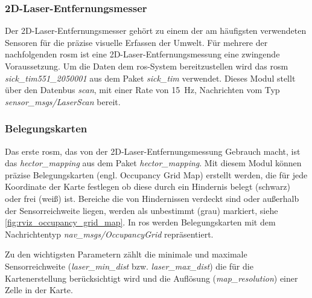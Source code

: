 \begin{comment}
--------------------------------------------------------------------------------
- \url{http://wiki.ros.org/sick_tim}
\end{comment}
\subsubsection{2D-Laser-Entfernungsmesser}

Der 2D-Laser-Entfernungsmesser gehört zu einem der am häufigsten verwendeten Sensoren für die präzise visuelle Erfassen der Umwelt. Für mehrere der nachfolgenden \Gls{rosm} ist eine 2D-Laser-Entfernungsmessung eine zwingende Voraussetzung. Um die Daten dem \Gls{ros}-System bereitzustellen wird das \Gls{rosm} \textit{sick\_tim551\_2050001} aus dem Paket \textit{sick\_tim} verwendet. Dieses Modul stellt über den Datenbus \textit{scan}, mit einer Rate von \SI{15}{\hertz}, Nachrichten vom Typ \textit{sensor\_msgs/LaserScan} bereit.


\begin{comment}
--------------------------------------------------------------------------------
- \url{http://wiki.ros.org/hector_mapping}
\end{comment}
\subsubsection{Belegungskarten}

Das erste \Gls{rosm}, das von der 2D-Laser-Entfernungsmessung Gebrauch macht, ist das \textit{hector\_mapping} aus dem Paket \textit{hector\_mapping}. Mit diesem Modul können präzise Belegungskarten (engl. Occupancy Grid Map) erstellt werden, die für jede Koordinate der Karte festlegen ob diese durch ein Hindernis belegt (schwarz) oder frei (weiß) ist. Bereiche die von Hindernissen verdeckt sind oder außerhalb der Sensorreichweite liegen, werden als unbestimmt (grau) markiert, siehe \autoref{fig:rviz_occupancy_grid_map}. In \Gls{ros} werden Belegungskarten mit dem Nachrichtentyp \textit{nav\_msgs/OccupancyGrid} repräsentiert.

Zu den wichtigsten Parametern zählt die minimale und maximale Sensorreichweite (\textit{laser\_min\_dist} bzw. \textit{laser\_max\_dist}) die für die Kartenerstellung berücksichtigt wird und die Auflösung (\textit{map\_resolution}) einer Zelle in der Karte.

